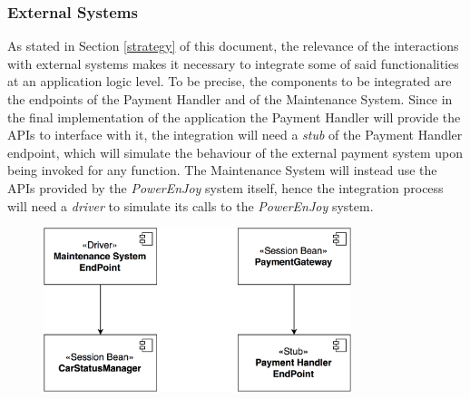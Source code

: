 \subsubsection{External Systems}
As stated in Section \ref{strategy} of this document, the relevance of the interactions with external systems makes it necessary to integrate some of said functionalities at an application logic level.
\noindent
To be precise, the components to be integrated are the endpoints of the Payment Handler and of the Maintenance System. Since in the final implementation of the application the Payment Handler will provide the APIs to interface with it, the integration will need a \emph{stub} of the Payment Handler endpoint, which will simulate the behaviour of the external payment system upon being invoked for any function. The Maintenance System will instead use the APIs provided by the \textit{PowerEnJoy} system itself, hence the integration process will need a \emph{driver} to simulate its calls to the \textit{PowerEnJoy} system.

\begin{figure}[H]
\begin{center}
		\includegraphics[width=0.8\textwidth]{./integration_strategy/diagrams/external_systems.png}
\end{center}
\end{figure}